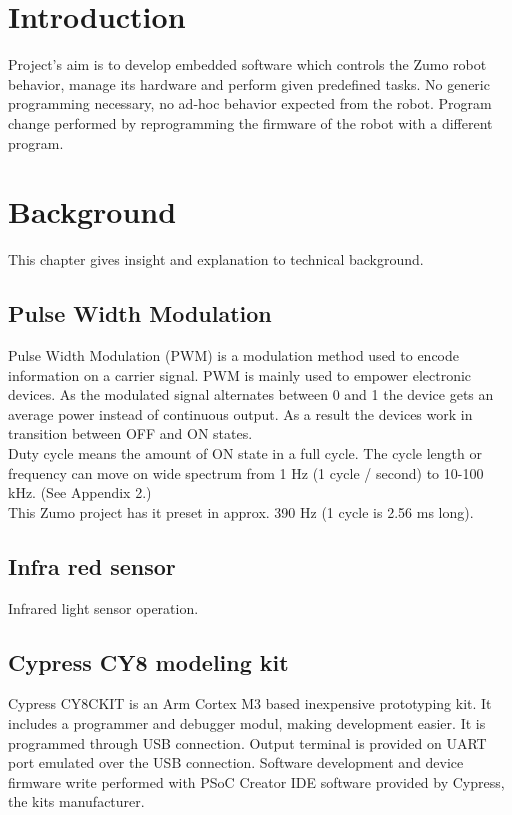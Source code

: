 \documentclass[11pt,a4paper,oneside,article]{memoir}
\begin{document}
\pagestyle{plain}

\setcounter{page}{1} %

\chapter{Introduction}
Project's aim is to develop embedded software which controls the Zumo robot behavior, manage its hardware and perform given predefined tasks. No generic programming necessary, no ad-hoc behavior expected from the robot. Program change performed by reprogramming the firmware of the robot with a different program.

\chapter{Background}

This chapter gives insight and explanation to technical background.

\section{Pulse Width Modulation}
Pulse Width Modulation (PWM) is a modulation method used to encode information on a carrier signal. PWM is mainly used to empower electronic devices. As the modulated signal alternates between 0 and 1 the device gets an average power instead of continuous output. As a result the devices work in transition between OFF and ON states.\\
Duty cycle means the amount of ON state in a full cycle. The cycle length or frequency can move on wide spectrum from 1 Hz (1 cycle / second) to 10-100 kHz. (See Appendix 2.)\\
This Zumo project has it preset in approx. 390 Hz (1 cycle is 2.56 ms long).\cite{wikipedia:PWM}

\section{Infra red sensor}
Infrared light sensor operation.

\section{Cypress CY8 modeling kit}
Cypress CY8CKIT is an Arm Cortex M3 based inexpensive prototyping kit. It includes a programmer and debugger modul, making development easier. It is programmed through USB connection. Output terminal is provided on UART port emulated over the USB connection. Software development and device firmware write performed with PSoC Creator IDE software provided by Cypress, the kits manufacturer.
\end{document}
